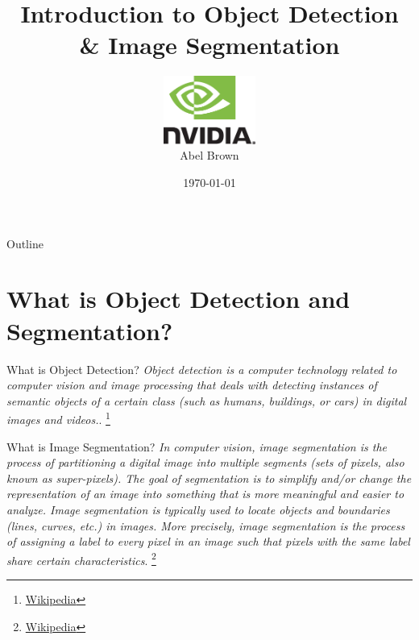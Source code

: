 \documentclass[handout]{beamer}
\title{Introduction to Object Detection \\ \& Image Segmentation}
\author{
	\includegraphics[width=3cm]{../media/logo/NVLogo_2D.eps}
	\vspace{0.75cm}
	\\Abel Brown}
\date{\today}
\begin{document}
\frame{\titlepage}

\begin{frame}{Outline}
\tableofcontents
\end{frame}




\section{What is Object Detection and Segmentation?}
\begin{frame}{What is Object Detection?}
\emph{Object detection is a computer technology related to computer vision and image processing that deals with detecting instances of semantic objects of a certain class (such as humans, buildings, or cars) in digital images and videos.}. \footnote{\href{https://en.wikipedia.org/wiki/Object_detection}{\color{blue}Wikipedia}}
\end{frame}

\begin{frame}{What is Image Segmentation?}
\emph{In computer vision, image segmentation is the process of partitioning a digital image into multiple segments (sets of pixels, also known as super-pixels). The goal of segmentation is to simplify and/or change the representation of an image into something that is more meaningful and easier to analyze.  Image segmentation is typically used to locate objects and boundaries (lines, curves, etc.) in images.  More precisely, image segmentation is the process of assigning a label to every pixel in an image such that pixels with the same label share certain characteristics}. \footnote{\href{https://en.wikipedia.org/wiki/Image_segmentation}{\color{blue}Wikipedia}}
\end{frame}
\end{document}
